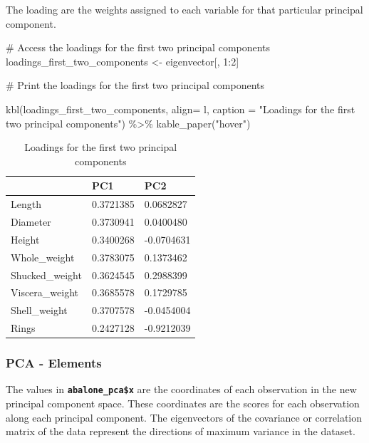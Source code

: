 \documentclass[
  letterpaper,
  DIV=11,
  numbers=noendperiod]{scrreprt}
\newenvironment{Shaded}{\begin{snugshade}}{\end{snugshade}}
\newcommand{\AttributeTok}[1]{\textcolor[rgb]{0.40,0.45,0.13}{#1}}
\newcommand{\CommentTok}[1]{\textcolor[rgb]{0.37,0.37,0.37}{#1}}
\newcommand{\DecValTok}[1]{\textcolor[rgb]{0.68,0.00,0.00}{#1}}
\newcommand{\FunctionTok}[1]{\textcolor[rgb]{0.28,0.35,0.67}{#1}}
\newcommand{\NormalTok}[1]{\textcolor[rgb]{0.00,0.23,0.31}{#1}}
\newcommand{\OtherTok}[1]{\textcolor[rgb]{0.00,0.23,0.31}{#1}}
\newcommand{\SpecialCharTok}[1]{\textcolor[rgb]{0.37,0.37,0.37}{#1}}
\newcommand{\StringTok}[1]{\textcolor[rgb]{0.13,0.47,0.30}{#1}}
\begin{document}
The loading are the weights assigned to each variable for that
particular principal component.

\begin{Shaded}
\begin{Highlighting}[]
\CommentTok{\# Access the loadings for the first two principal components}
\NormalTok{loadings\_first\_two\_components }\OtherTok{\textless{}{-}}\NormalTok{ eigenvector[, }\DecValTok{1}\SpecialCharTok{:}\DecValTok{2}\NormalTok{]}

\CommentTok{\# Print the loadings for the first two principal components}

\FunctionTok{kbl}\NormalTok{(loadings\_first\_two\_components, }\AttributeTok{align=} \StringTok{\textquotesingle{}l\textquotesingle{}}\NormalTok{, }\AttributeTok{caption =} \StringTok{"Loadings for the first two principal components"}\NormalTok{) }\SpecialCharTok{\%\textgreater{}\%}
  \FunctionTok{kable\_paper}\NormalTok{(}\StringTok{"hover"}\NormalTok{)}
\end{Highlighting}
\end{Shaded}

\begin{table}

\caption{Loadings for the first two principal components}
\centering
\begin{tabular}[t]{l|l|l}
\hline
  & PC1 & PC2\\
\hline
Length & 0.3721385 & 0.0682827\\
\hline
Diameter & 0.3730941 & 0.0400480\\
\hline
Height & 0.3400268 & -0.0704631\\
\hline
Whole\_weight & 0.3783075 & 0.1373462\\
\hline
Shucked\_weight & 0.3624545 & 0.2988399\\
\hline
Viscera\_weight & 0.3685578 & 0.1729785\\
\hline
Shell\_weight & 0.3707578 & -0.0454004\\
\hline
Rings & 0.2427128 & -0.9212039\\
\hline
\end{tabular}
\end{table}

\hypertarget{pca---elements}{%
\subsubsection{PCA - Elements}\label{pca---elements}}

The values in \textbf{\texttt{abalone\_pca\$x}} are the coordinates of
each observation in the new principal component space. These coordinates
are the scores for each observation along each principal component. The
eigenvectors of the covariance or correlation matrix of the data
represent the directions of maximum variance in the dataset.
\end{document}
